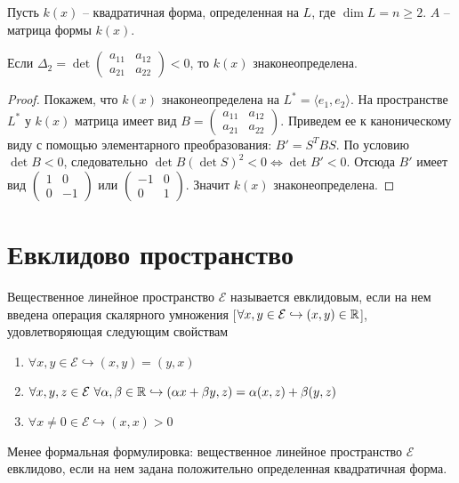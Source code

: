 Пусть $k(x)$ -- квадратичная форма, определенная на $L$, где $\dim L =n\geqslant 2$. $A$ -- матрица формы $k(x)$.
\begin{lemma}
    Если $\Delta_2=\det \begin{pmatrix}
        a_{11} & a_{12} \\
        a_{21} & a_{22}
    \end{pmatrix} < 0$, то $k(x)$ знаконеопределена.
\end{lemma}
\begin{proof}
    Покажем, что $k(x)$ знаконеопределена на $L^*=\langle e_1, e_2\rangle$. На пространстве $L^*$ у $k(x)$ матрица имеет вид $B=\begin{pmatrix}
        a_{11} & a_{12} \\
        a_{21} & a_{22}
    \end{pmatrix}$. Приведем ее к каноническому виду с помощью элементарного преобразования: $B'=S^TBS$. По условию $\det B < 0$, следовательно $\det B (\det S)^2 <0 \Leftrightarrow \det B'<0$. Отсюда $B'$ имеет вид $\begin{pmatrix}
        1 & 0 \\
        0 & -1
    \end{pmatrix}$ или $\begin{pmatrix}
        -1 & 0\\
        0 & 1
    \end{pmatrix}$. Значит $k(x)$ знаконеопределена.
\end{proof}

\section{Евклидово пространство}
\begin{definition}
    Вещественное линейное пространство $\mathcal{E}$ называется евклидовым, если на нем введена операция скалярного умножения [$\forall x,y \in \mathcal{E} \hookrightarrow (x,y)\in \mathbb{R}$], удовлетворяющая следующим свойствам
    \begin{enumerate}
        \item $\forall x,y \in \mathcal{E} \hookrightarrow(x,y)=(y,x)$
        \item $\forall x, y, z \in \mathcal{E} \ \forall\alpha, \beta \in \R \hookrightarrow (\alpha x+ \beta y, z)=\alpha(x,z)+\beta(y,z)$
        \item $\forall x\neq 0 \in \mathcal{E} \hookrightarrow (x,x) > 0$
    \end{enumerate}
\end{definition}
Менее формальная формулировка: вещественное линейное пространство $\mathcal{E}$ евклидово, если на нем задана положительно определенная квадратичная форма.

